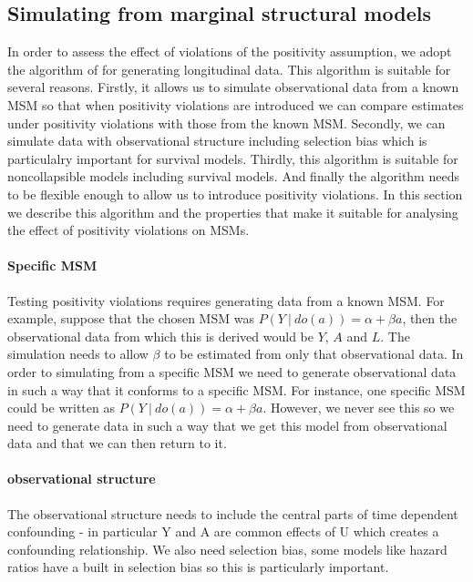 \documentclass[11pt]{article}
\begin{document}
    \subsection{Simulating from marginal structural
models}\label{simulating-from-marginal-structural-models}

In order to assess the effect of violations of the positivity
assumption, we adopt the algorithm of \citet{Havercroft2012} for
generating longitudinal data. This algorithm is suitable for several
reasons. Firstly, it allows us to simulate observational data from a
known MSM so that when positivity violations are introduced we can
compare estimates under positivity violations with those from the known
MSM. Secondly, we can simulate data with observational structure
including selection bias which is particulalry important for survival
models. Thirdly, this algorithm is suitable for noncollapsible models
including survival models. And finally the algorithm needs to be
flexible enough to allow us to introduce positivity violations. In this
section we describe this algorithm and the properties that make it
suitable for analysing the effect of positivity violations on MSMs.

\paragraph{Specific MSM}\label{specific-msm}

Testing positivity violations requires generating data from a known MSM.
For example, suppose that the chosen MSM was
\(P(Y\ |\ do(a)) = \alpha + \beta a\), then the observational data from
which this is derived would be \(Y\), \(A\) and \(L\). The simulation
needs to allow \(\beta\) to be estimated from only that observational
data. In order to simulating from a specific MSM we need to generate
observational data in such a way that it conforms to a specific MSM. For
instance, one specific MSM could be written as
\(P(Y\ |\ do(a)) = \alpha + \beta a\). However, we never see this so we
need to generate data in such a way that we get this model from
observational data and that we can then return to it.

\paragraph{observational structure}\label{observational-structure}

The observational structure needs to include the central parts of time
dependent confounding - in particular Y and A are common effects of U
which creates a confounding relationship. We also need selection bias,
some models like hazard ratios have a built in selection bias so this is
particularly important.
\end{document}
